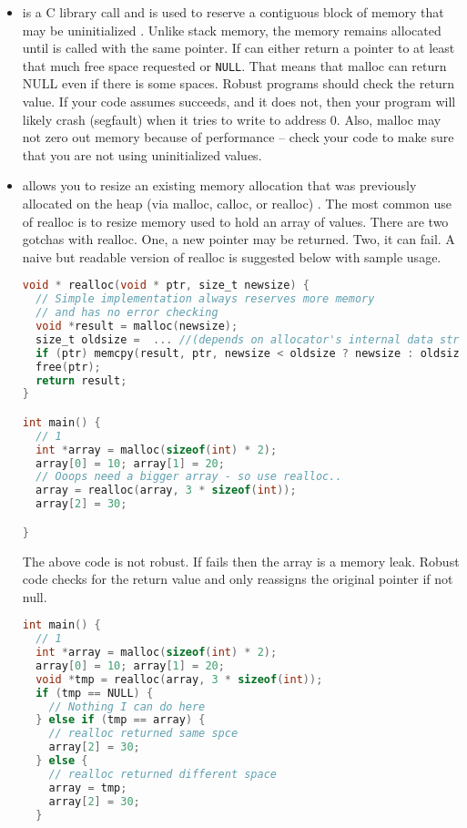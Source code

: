 \begin{itemize}

\item {} is a C library call and is used to reserve a contiguous block of memory that may be uninitialized \cite[P. 348]{jones2010wg14}.
Unlike stack memory, the memory remains allocated until  is called with the same pointer.
If  can either return a pointer to at least that much free space requested or \texttt{NULL}.
That means that malloc can return NULL even if there is some spaces.
Robust programs should check the return value.
If your code assumes  succeeds, and it does not, then your program will likely crash (segfault) when it tries to write to address 0.
Also, malloc may not zero out memory because of performance -- check your code to make sure that you are not using uninitialized values.

\item {} allows you to resize an existing memory allocation that was previously allocated on the heap (via malloc, calloc, or realloc) \cite[P. 349]{jones2010wg14}.
The most common use of realloc is to resize memory used to hold an array of values.
There are two gotchas with realloc.
One, a new pointer may be returned.
Two, it can fail.
A naive but readable version of realloc is suggested below with sample usage.

\begin{lstlisting}[language=C]
void * realloc(void * ptr, size_t newsize) {
  // Simple implementation always reserves more memory
  // and has no error checking
  void *result = malloc(newsize);
  size_t oldsize =  ... //(depends on allocator's internal data structure)
  if (ptr) memcpy(result, ptr, newsize < oldsize ? newsize : oldsize);
  free(ptr);
  return result;
}

int main() {
  // 1
  int *array = malloc(sizeof(int) * 2);
  array[0] = 10; array[1] = 20;
  // Ooops need a bigger array - so use realloc..
  array = realloc(array, 3 * sizeof(int));
  array[2] = 30;

}
\end{lstlisting}

The above code is not robust.
If  fails then the array is a memory leak.
Robust code checks for the return value and only reassigns the original pointer if not null.

\begin{lstlisting}[language=C]
int main() {
  // 1
  int *array = malloc(sizeof(int) * 2);
  array[0] = 10; array[1] = 20;
  void *tmp = realloc(array, 3 * sizeof(int));
  if (tmp == NULL) {
    // Nothing I can do here
  } else if (tmp == array) {
    // realloc returned same spce
    array[2] = 30;
  } else {
    // realloc returned different space
    array = tmp;
    array[2] = 30;
  }


\end{lstlisting}
\end{itemize}

